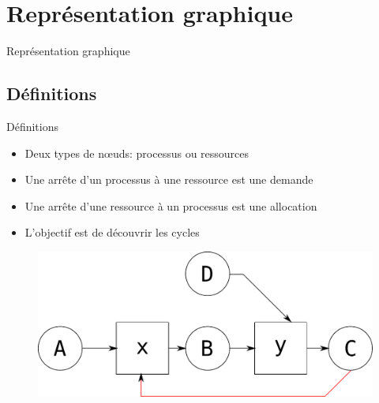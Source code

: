 \def\sectitle{Représentation graphique}
\section{\sectitle}
\begin{frame}{\sectitle}
\def\subsectitle{Définitions}
\subsection{\subsectitle}
\begin{block}{\subsectitle}
\begin{itemize}
    \item Deux types de n{\oe}uds: processus ou ressources
    \item Une arrête d'un processus à une ressource est une demande
    \item Une arrête d'une ressource à un processus est une allocation
    \item L'objectif est de découvrir les cycles
\end{itemize}
\end{block}

\begin{figure}
\includegraphics[width=.8\textwidth]{images/deadlockGraph01.pdf}
\end{figure}

\end{frame}

